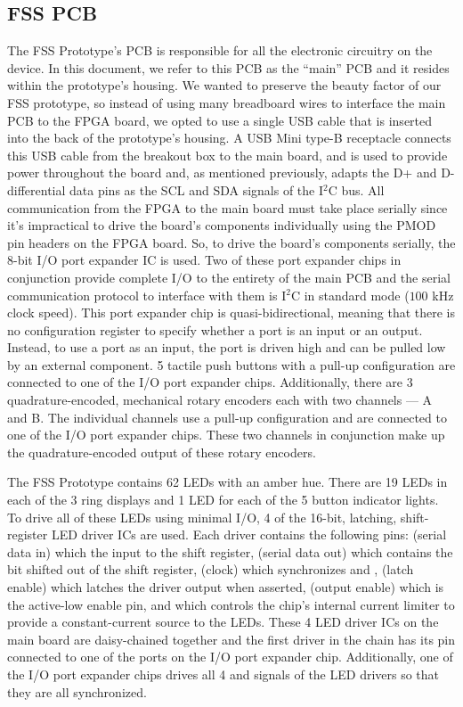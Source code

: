 \documentclass[conference]{IEEEtran}
\begin{document}
\subsection{FSS PCB}
The FSS Prototype's PCB is responsible for all the electronic circuitry on the device. In this document, we refer to this PCB as the ``main'' PCB and it resides within the prototype's housing. We wanted to preserve the beauty factor of our FSS prototype, so instead of using many breadboard wires to interface the main PCB to the FPGA board, we opted to use a single USB cable that is inserted into the back of the prototype's housing. A USB Mini type-B receptacle connects this USB cable from the breakout box to the main board, and is used to provide power throughout the board and, as mentioned previously, adapts the D+ and D- differential data pins as the SCL and SDA signals of the I$^2$C bus. All communication from the FPGA to the main board must take place serially since it's impractical to drive the board's components individually using the PMOD pin headers on the FPGA board. So, to drive the board's components serially, the  8-bit I/O port expander IC is used. Two of these port expander chips in conjunction provide complete I/O to the entirety of the main PCB and the serial communication protocol to interface with them is I$^2$C in standard mode ($100$ kHz clock speed). This port expander chip is quasi-bidirectional, meaning that there is no configuration register to specify whether a port is an input or an output. Instead, to use a port as an input, the port is driven high and can be pulled low by an external component. 5 tactile push buttons with a pull-up configuration are connected to one of the I/O port expander chips. Additionally, there are 3 quadrature-encoded, mechanical rotary encoders each with two channels --- A and B. The individual channels use a pull-up configuration and are connected to one of the I/O port expander chips. These two channels in conjunction make up the quadrature-encoded output of these rotary encoders.

The FSS Prototype contains 62 LEDs with an amber hue. There are 19 LEDs in each of the 3 ring displays and 1 LED for each of the 5 button indicator lights. To drive all of these LEDs using minimal I/O, 4 of the  16-bit, latching, shift-register LED driver ICs are used. Each driver contains the following pins:  (serial data in) which the input to the shift register,  (serial data out) which contains the bit shifted out of the shift register,  (clock) which synchronizes  and ,  (latch enable) which latches the driver output when asserted,  (output enable) which is the active-low enable pin, and  which controls the chip's internal current limiter to provide a constant-current source to the LEDs. These 4 LED driver ICs on the main board are daisy-chained together and the first driver in the chain has its  pin connected to one of the ports on the I/O port expander chip. Additionally, one of the I/O port expander chips drives all 4  and  signals of the LED drivers so that they are all synchronized.
\end{document}

